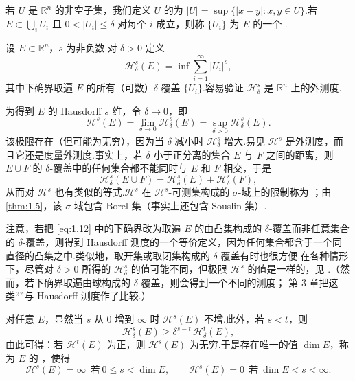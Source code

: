 若 $U$ 是 $\mathbb{R}^n$ 的非空子集，我们定义 $U$ 的为 $|U|=\sup\{|x-y|:x,y\in U\}$.若 $E\subset\bigcup_{i}U_i$ 且 $0<|U_i|\leq\delta$ 对每个 $i$ 成立，则称 $\{U_i\}$ 为 $E$ 的一个 .

设 $E\subset\mathbb{R}^n$，$s$ 为非负数.对 $\delta>0$ 定义
\begin{equation}\label{eq:1.12}
  \mathcal{H}^s_{\delta}(E)=\inf\sum_{i=1}^{\infty}|U_i|^s,
\end{equation}
其中下确界取遍 $E$ 的所有（可数）$\delta$-覆盖 $\{U_i\}$.容易验证 $\mathcal{H}^s_{\delta}$ 是 $\mathbb{R}^n$ 上的外测度.

为得到 $E$ 的 Hausdorff $s$ 维，令 $\delta\to 0$，即
\begin{equation}\label{eq:1.13}
  \mathcal{H}^{s}(E)=\lim_{\delta\to 0}\mathcal{H}^{s}_{\delta}(E)=\sup_{\delta>0}\mathcal{H}^{s}_{\delta}(E).
\end{equation}
该极限存在（但可能为无穷），因为当 $\delta$ 减小时 $\mathcal{H}^s_{\delta}$ 增大.易见 $\mathcal{H}^s$ 是外测度，而且它还是度量外测度.事实上，若 $\delta$ 小于正分离的集合 $E$ 与 $F$ 之间的距离，则 $E\cup F$ 的 $\delta$-覆盖中的任何集合都不能同时与 $E$ 和 $F$ 相交，于是
\[
  \mathcal{H}^s_{\delta}(E\cup F)=\mathcal{H}^s_{\delta}(E)+\mathcal{H}^s_{\delta}(F),
\]
从而对 $\mathcal{H}^s$ 也有类似的等式.$\mathcal{H}^s$ 在 $\mathcal{H}^s$-可测集构成的 $\sigma$-域上的限制称为 ；由 \cref{thm:1.5}，该 $\sigma$-域包含 Borel 集（事实上还包含 Souslin 集）.

注意，若把 \eqref{eq:1.12} 中的下确界改为取遍 $E$ 的由凸集构成的 $\delta$-覆盖而非任意集合的 $\delta$-覆盖，则得到 Hausdorff 测度的一个等价定义，因为任何集合都含于一个同直径的凸集之中.类似地，取开集或取闭集构成的 $\delta$-覆盖有时也很方便.在各种情形下，尽管对 $\delta>0$ 所得的 $\mathcal{H}^s_{\delta}$ 的值可能不同，但极限 $\mathcal{H}^s$ 的值是一样的，见 \textcite{davies1956}.（然而，若下确界取遍由球构成的 $\delta$-覆盖，则会得到一个不同的测度；\textcite{besicovitch1928a} 第 3 章把这类``''与 Hausdorff 测度作了比较.）

对任意 $E$，显然当 $s$ 从 $0$ 增到 $\infty$ 时 $\mathcal{H}^s(E)$ 不增.此外，若 $s<t$，则
\[
  \mathcal{H}^s_{\delta}(E)\geq\delta^{s-t}\,\mathcal{H}^t_{\delta}(E),
\]
由此可得：若 $\mathcal{H}^t(E)$ 为正，则 $\mathcal{H}^s(E)$ 为无穷.于是存在唯一的值 $\dim E$，称为 $E$ 的 ，使得
\begin{equation}\label{eq:1.14}
  \mathcal{H}^{s}(E)=\infty\ \ \text{若}\ 0\leq s<\dim E,
  \qquad
  \mathcal{H}^{s}(E)=0\ \ \text{若}\ \dim E<s<\infty.
\end{equation}

